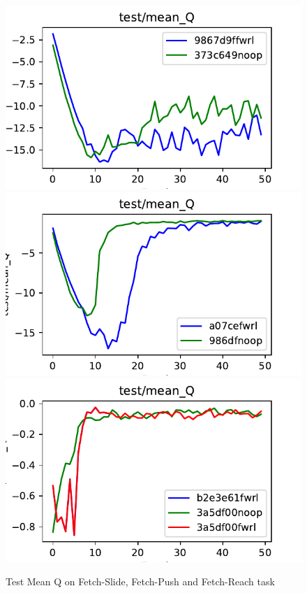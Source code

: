 \begin{figure}
  \def\frac{0.32}
    \includegraphics[width=\frac\columnwidth]{media/res/373c649_FetchSlide-v1-noop/test/mean_Q.pdf}%
    \includegraphics[width=\frac\columnwidth]{media/res/a077c9e_FetchPush-v1-fwrl/test/mean_Q.pdf}%
    \includegraphics[width=\frac\columnwidth]{media/res/3a5df00_FetchReach-v1-fwrl/test/mean_Q.pdf}
    \caption{Test Mean Q on Fetch-Slide, Fetch-Push and Fetch-Reach task}
    \label{fig:fetch-slide-success}
\end{figure}


